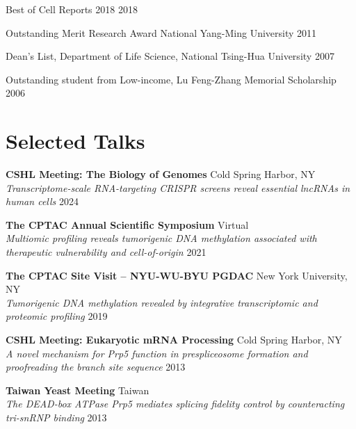 \documentclass[letterpaper,11pt]{cv}
\begin{document}
\begin{detaillist}

\item Best of Cell Reports 2018
    \hfill 2018

\item Outstanding Merit Research Award National Yang-Ming University
    \hfill 2011

\item Dean's List, Department of Life Science, National Tsing-Hua University
    \hfill 2007

\item Outstanding student from Low-income, Lu Feng-Zhang Memorial Scholarship
    \hfill
    2006

\end{detaillist}

\section{Selected Talks}
\begin{entrylist}
    \item \textbf{CSHL Meeting: The Biology of Genomes} \hfill Cold Spring Harbor, NY \\
    \textit{\small{Transcriptome-scale RNA-targeting CRISPR screens reveal essential lncRNAs in human cells}}
    \hfill 2024 

    \item \textbf{The CPTAC Annual Scientific Symposium} \hfill Virtual \\
    \textit{\small{Multiomic profiling reveals tumorigenic DNA methylation associated with therapeutic vulnerability and cell-of-origin}} \hfill 2021

    \item \textbf{The CPTAC Site Visit – NYU-WU-BYU PGDAC} \hfill New York University, NY \\
    \textit{\small{Tumorigenic DNA methylation revealed by integrative transcriptomic and proteomic profiling}} \hfill 2019

    \item \textbf{CSHL Meeting: Eukaryotic mRNA Processing} \hfill Cold Spring Harbor, NY \\
    \textit{\small{A novel mechanism for Prp5 function in prespliceosome formation and proofreading the branch site sequence}}
    \hfill 2013

    \item \textbf{Taiwan Yeast Meeting} \hfill Taiwan \\
    \textit{\small{The DEAD-box ATPase Prp5 mediates splicing fidelity control by counteracting tri-snRNP binding}}
    \hfill 2013
\end{entrylist}
\end{document}
